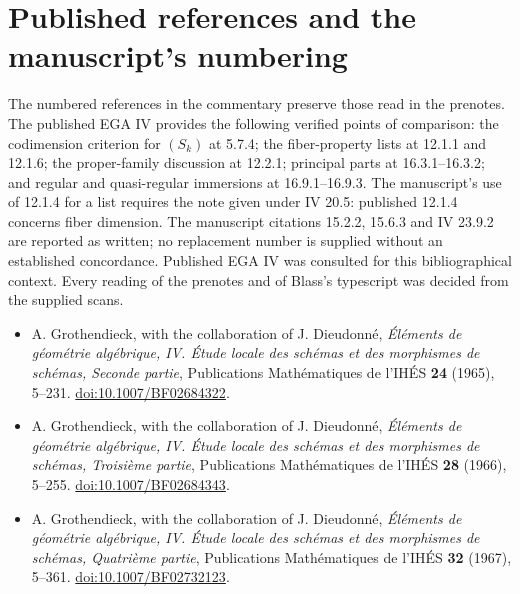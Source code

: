 \section*{Published references and the manuscript's numbering}
The numbered references in the commentary preserve those read in the prenotes. The published EGA IV provides the following verified points of comparison: the codimension criterion for $(S_k)$ at 5.7.4; the fiber-property lists at 12.1.1 and 12.1.6; the proper-family discussion at 12.2.1; principal parts at 16.3.1--16.3.2; and regular and quasi-regular immersions at 16.9.1--16.9.3. The manuscript's use of 12.1.4 for a list requires the note given under IV 20.5: published 12.1.4 concerns fiber dimension. The manuscript citations 15.2.2, 15.6.3 and IV 23.9.2 are reported as written; no replacement number is supplied without an established concordance. Published EGA IV was consulted for this bibliographical context. Every reading of the prenotes and of Blass's typescript was decided from the supplied scans.

\begin{itemize}
\item A. Grothendieck, with the collaboration of J. Dieudonn\'e, \emph{\'El\'ements de g\'eom\'etrie alg\'ebrique, IV. \'Etude locale des sch\'emas et des morphismes de sch\'emas, Seconde partie}, Publications Math\'ematiques de l'IH\'ES \textbf{24} (1965), 5--231. \href{https://www.numdam.org/articles/10.1007/BF02684322/}{doi:10.1007/BF02684322}.
\item A. Grothendieck, with the collaboration of J. Dieudonn\'e, \emph{\'El\'ements de g\'eom\'etrie alg\'ebrique, IV. \'Etude locale des sch\'emas et des morphismes de sch\'emas, Troisi\`eme partie}, Publications Math\'ematiques de l'IH\'ES \textbf{28} (1966), 5--255. \href{https://www.numdam.org/articles/10.1007/BF02684343/}{doi:10.1007/BF02684343}.
\item A. Grothendieck, with the collaboration of J. Dieudonn\'e, \emph{\'El\'ements de g\'eom\'etrie alg\'ebrique, IV. \'Etude locale des sch\'emas et des morphismes de sch\'emas, Quatri\`eme partie}, Publications Math\'ematiques de l'IH\'ES \textbf{32} (1967), 5--361. \href{https://www.numdam.org/articles/10.1007/BF02732123/}{doi:10.1007/BF02732123}.
\end{itemize}
